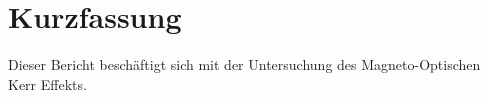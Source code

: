 \section{Kurzfassung}

	Dieser Bericht beschäftigt sich mit der Untersuchung des Magneto-Optischen Kerr Effekts.
